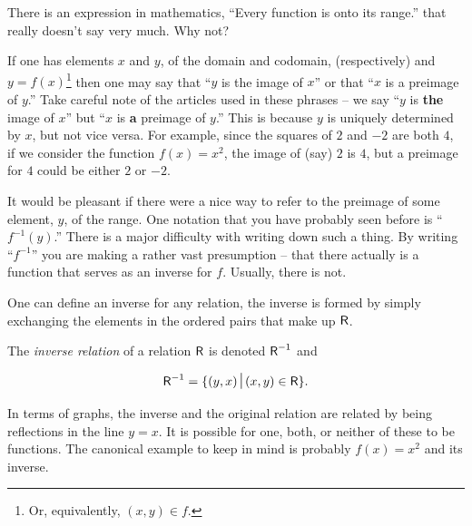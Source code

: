 \begin{exer}
There is an expression in mathematics, ``Every function is onto its %
range.'' that really doesn't say very much.  Why not?
\end{exer}

If one has elements $x$ and $y$, of the domain and codomain, (respectively)
and $y = f(x)$\footnote{Or, equivalently, $(x,y) \in f$.} then one may 
say that ``$y$ is the image of $x$'' or that
``$x$ is a preimage of $y$.''  Take careful note of the articles used in
these phrases -- we say  ``$y$ is {\bf the} image of $x$'' but 
``$x$ is {\bf a} preimage of $y$.''  This is because $y$ is uniquely determined
by $x$, but not vice versa.  For example, since the squares of $2$ and $-2$ are
both $4$, if we consider the function $f(x) = x^2$, the image of (say) $2$ 
is $4$, but a preimage for $4$ could be either $2$ or $-2$.

It would be pleasant if there were a nice way to refer to the preimage of
some element, $y$, of the range.  One notation that you have probably 
seen before is ``$f^{-1}(y)$.''  There is a major difficulty with writing 
down such a thing.  By writing ``$f^{-1}$'' you are making a rather
vast presumption -- that there actually is a function that serves as an
inverse for $f$.  Usually, there is not.  

One can define an inverse for any relation, the inverse is formed by
simply exchanging the elements in the ordered pairs that make up $\mbox{\textsf R}$.

\begin{defi}
The \emph{inverse relation} of a relation $\mbox{\textsf R}$
is denoted $\mbox{\textsf R}^{-1}$ and 

\[ \relR^{-1} = \{ (y,x) \suchthat (x,y) \in \relR \}. \]
\end{defi}

In terms of graphs, the inverse and the original relation are related
by being reflections in the line $y=x$.  It is possible for one, both,
or neither of these to be functions.  The canonical example to keep
in mind is probably $f(x) = x^2$ and its inverse.


